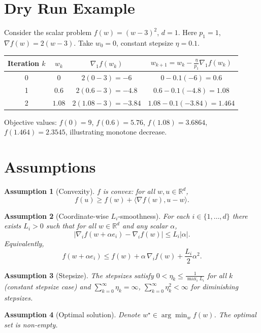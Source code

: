 \documentclass[11pt]{article}
\newtheorem{assumption}{Assumption}
\begin{document}
\section*{Dry Run Example}
Consider the scalar problem $f(w)=(w-3)^2$, $d=1$.
Here $p_1=1$, $\nabla f(w)=2(w-3)$.  
Take $w_0=0$, constant stepsize $\eta=0.1$.

\begin{tabular}{c|c|c|c}
Iteration $k$ & $w_k$ & $\nabla_1 f(w_k)$ & $w_{k+1}=w_k-\frac{\eta}{p_1}\nabla_1 f(w_k)$ \\ \hline
0 & $0$ & $2(0-3)=-6$ & $0-0.1(-6)=0.6$ \\
1 & $0.6$ & $2(0.6-3)=-4.8$ & $0.6-0.1(-4.8)=1.08$ \\
2 & $1.08$ & $2(1.08-3)=-3.84$ & $1.08-0.1(-3.84)=1.464$ \\
\end{tabular}

Objective values: $f(0)=9$, $f(0.6)=5.76$, $f(1.08)=3.6864$, $f(1.464)=2.3545$, illustrating monotone decrease.

\newpage
\section*{Assumptions}
\begin{assumption}[Convexity]
$f$ is convex: for all $w,u\in\mathbb{R}^{d}$,
\[
f(u)\ge f(w)+\langle\nabla f(w),u-w\rangle .
\]
\end{assumption}
\begin{assumption}[Coordinate-wise $L_i$‑smoothness]
For each $i\in\{1,\dots ,d\}$ there exists $L_i>0$ such that for all $w\in\mathbb{R}^{d}$ and any scalar $\alpha$,
\[
\big|\nabla_i f(w+\alpha e_i)-\nabla_i f(w)\big|\le L_i |\alpha|.
\]
Equivalently,
\[
f(w+\alpha e_i)\le f(w)+\alpha\,\nabla_i f(w)+\frac{L_i}{2}\alpha^{2}.
\]
\end{assumption}
\begin{assumption}[Stepsize]
The stepsizes satisfy $0<\eta_k\le \frac{1}{\max_i L_i}$ for all $k$ (constant stepsize case) and $\sum_{k=0}^{\infty}\eta_k=\infty$, $\sum_{k=0}^{\infty}\eta_k^{2}<\infty$ for diminishing stepsizes.
\end{assumption}
\begin{assumption}[Optimal solution]
Denote $w^{\star}\in\arg\min_{w}f(w)$. The optimal set is non‑empty.
\end{assumption}
\end{document}
